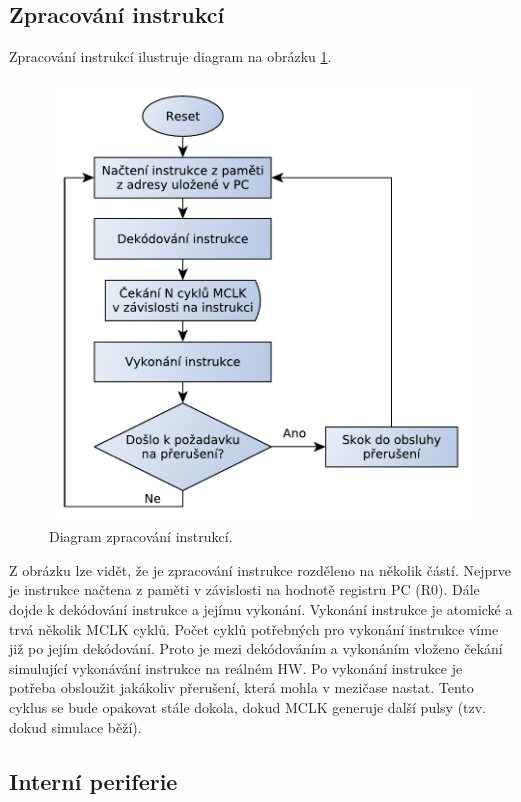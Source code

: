 \subsection{Zpracování instrukcí}

Zpracování instrukcí ilustruje diagram na obrázku \ref{fig:msp430_inst}.

\begin{figure}[h]
\centering
\includegraphics[trim=0cm 0cm 0cm 0cm, scale=0.7]{fig/msp430_inst}
\caption{Diagram zpracování instrukcí.}
\label{fig:msp430_inst}
\end{figure}

Z obrázku lze vidět, že je zpracování instrukce rozděleno na několik částí. Nejprve je instrukce načtena z paměti v závislosti na hodnotě registru PC (R0).
Dále dojde k dekódování instrukce a jejímu vykonání. Vykonání instrukce je atomické a trvá několik MCLK cyklů. Počet cyklů potřebných pro vykonání
instrukce víme již po jejím dekódování. Proto je mezi dekódováním a vykonáním vloženo čekání simulující vykonávání instrukce na reálném HW.
Po vykonání instrukce je potřeba obsloužit jakákoliv přerušení, která mohla v mezičase nastat. Tento cyklus se bude opakovat stále dokola, dokud MCLK generuje další pulsy (tzv. dokud simulace běží).

\subsection{Interní periferie}


